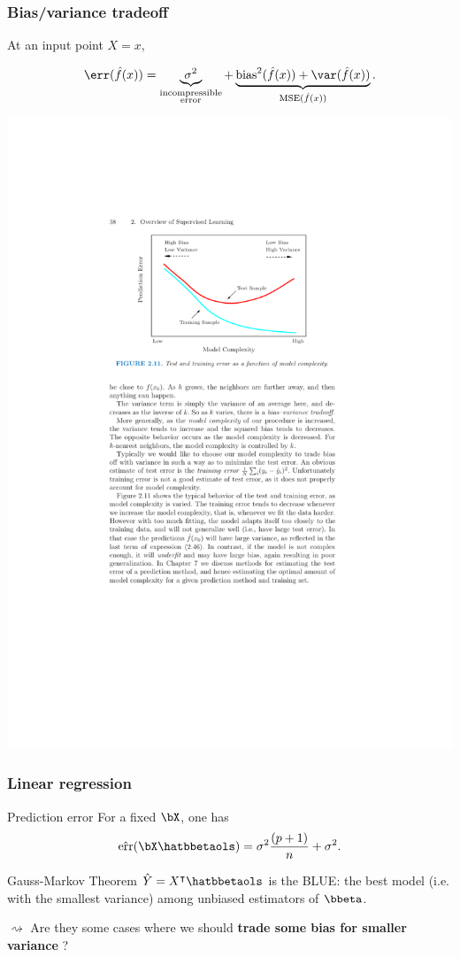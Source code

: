 \documentclass{beamer}\usepackage[]{graphicx}\usepackage[]{color}
\begin{document}
\begin{frame}
  \frametitle{Bias/variance tradeoff}

  At an input point $X=x$,
  \begin{overlayarea}{\textwidth}{\textheight}
    \begin{equation*}
      \err(\hat{f}(x))                =
      \underbrace{\sigma^2}_{\substack{\text{incompressible}\\\text{error}}}
      +
      \underbrace{\text{bias}^2(\hat{f}(x))                    +
        \var(\hat{f}(x))}_{\mathrm{MSE}(\hat{f}(x))}.
    \end{equation*}

    \begin{center}
      \includegraphics[width=.7\textwidth]{figures/tradeoff}
    \end{center}
  \end{overlayarea}

\end{frame}

\begin{frame}
  \frametitle{Linear regression}

  \begin{block}{Prediction error}
    For a fixed $\bX$, one has
   \begin{equation*}
      \hat{\mathrm{err}}(\bX \hatbbetaols)  = \sigma^2 \frac{(p+1)}{n} + \sigma^2.
    \end{equation*}
  \end{block}
  \vfill  
  
  \begin{block}{Gauss-Markov Theorem}
    $\hat Y = X^\intercal \hatbbetaols$ is the BLUE: the best model 
    (i.e. with the smallest variance) among unbiased estimators of 
    $\bbeta$.
  \end{block}
  \vfill

  $\rightsquigarrow$ Are  they some  cases where we  should \alert{\bf
    trade some bias for smaller variance} ?
\end{frame}
\end{document}

